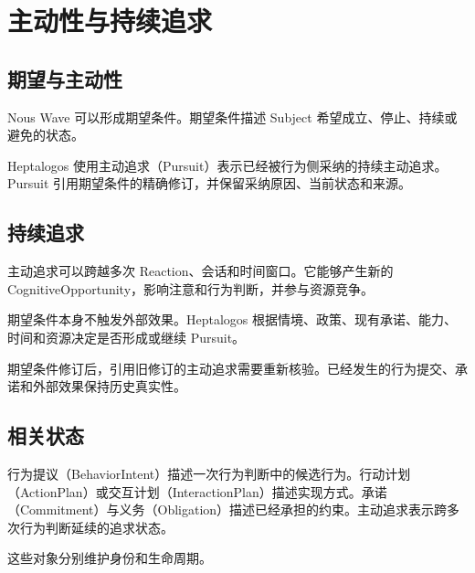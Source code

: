 \chapter{主动性与持续追求}

\section{期望与主动性}

Nous Wave 可以形成期望条件。期望条件描述 Subject 希望成立、停止、持续或避免的状态。

Heptalogos 使用主动追求（Pursuit）表示已经被行为侧采纳的持续主动追求。Pursuit 引用期望条件的精确修订，并保留采纳原因、当前状态和来源。

\section{持续追求}

主动追求可以跨越多次 Reaction、会话和时间窗口。它能够产生新的 CognitiveOpportunity，影响注意和行为判断，并参与资源竞争。

期望条件本身不触发外部效果。Heptalogos 根据情境、政策、现有承诺、能力、时间和资源决定是否形成或继续 Pursuit。

期望条件修订后，引用旧修订的主动追求需要重新核验。已经发生的行为提交、承诺和外部效果保持历史真实性。

\section{相关状态}

行为提议（BehaviorIntent）描述一次行为判断中的候选行为。行动计划（ActionPlan）或交互计划（InteractionPlan）描述实现方式。承诺（Commitment）与义务（Obligation）描述已经承担的约束。主动追求表示跨多次行为判断延续的追求状态。

这些对象分别维护身份和生命周期。
